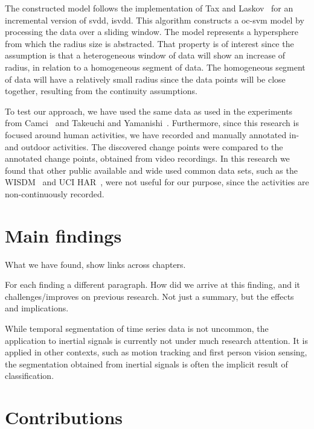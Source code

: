 The constructed model follows the implementation of Tax and Laskov~\cite{tax2003online} for an incremental version of \gls{svdd}, \gls{isvdd}.
This algorithm constructs a \gls{oc-svm} model by processing the data over a sliding window.
The model represents a hypersphere from which the radius size is abstracted.
That property is of interest since the assumption is that a heterogeneous window of data will show an increase of radius, in relation to a homogeneous segment of data.
The homogeneous segment of data will have a relatively small radius since the data points will be close together, resulting from the continuity assumptions.

To test our approach, we have used the same data as used in the experiments from Camci~\cite{camci2010change} and Takeuchi and Yamanishi~\cite{takeuchi2006unifying}.
Furthermore, since this research is focused around human activities, we have recorded and manually annotated in- and outdoor activities.
The discovered change points were compared to the annotated change points, obtained from video recordings.
In this research we found that other public available and wide used common data sets, such as the WISDM~\cite{kwapisz2011activity} and UCI HAR~\cite{anguita2012human}, were not useful for our purpose, since the activities are non-continuously recorded.




\section{Main findings}
What we have found, show links across chapters.

For each finding a different paragraph.
How did we arrive at this finding, and it challenges/improves on previous research.
Not just a summary, but the effects and implications.

While temporal segmentation of time series data is not uncommon, the application to inertial signals is currently not under much research attention.
It is applied in other contexts, such as motion tracking and first person vision sensing, the segmentation obtained from inertial signals is often the implicit result of classification.

\section{Contributions}


